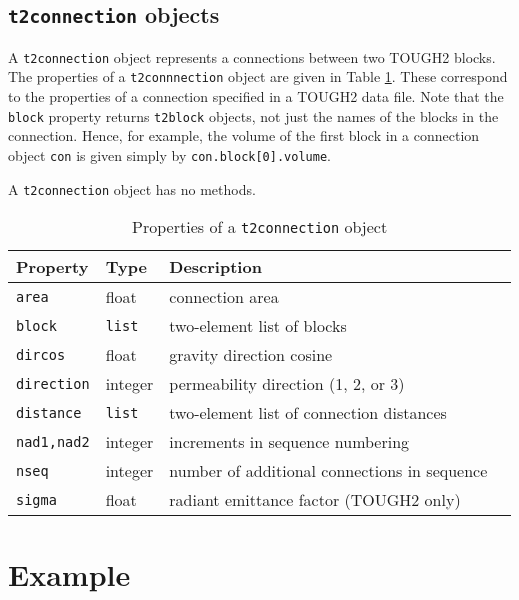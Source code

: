 \subsection{\texttt{t2connection} objects}

A \texttt{t2connection} object represents a connections between two TOUGH2 blocks.  The properties of a \texttt{t2connnection} object are given in Table \ref{tb:t2connection_properties}.  These correspond to the properties of a connection specified in a TOUGH2 data file.  Note that the \texttt{block} property returns \texttt{t2block} objects, not just the names of the blocks in the connection.  Hence, for example, the volume of the first block in a connection object \texttt{con} is given simply by \texttt{con.block[0].volume}.

A \texttt{t2connection} object has no methods.

\begin{table}
  \begin{center}
    \begin{tabular}{|l|l|l|l|}
      \hline
      \textbf{Property} & \textbf{Type} & \textbf{Description}\\
      \hline
      \texttt{area} & float & connection area\\
      \texttt{block} & \texttt{list} & two-element list of blocks\\
      \texttt{dircos} & float & gravity direction cosine\\
      \texttt{direction} & integer & permeability direction (1, 2, or 3)\\
      \texttt{distance} & \texttt{list} & two-element list of connection distances\\
      \texttt{nad1,nad2} & integer & increments in sequence numbering\\
      \texttt{nseq} & integer & number of additional connections in sequence\\
      \texttt{sigma} & float & radiant emittance factor (TOUGH2 only)\\
      \hline
    \end{tabular}
    \caption{Properties of a \texttt{t2connection} object}
    \label{tb:t2connection_properties}
  \end{center}
\end{table}

\section{Example}

